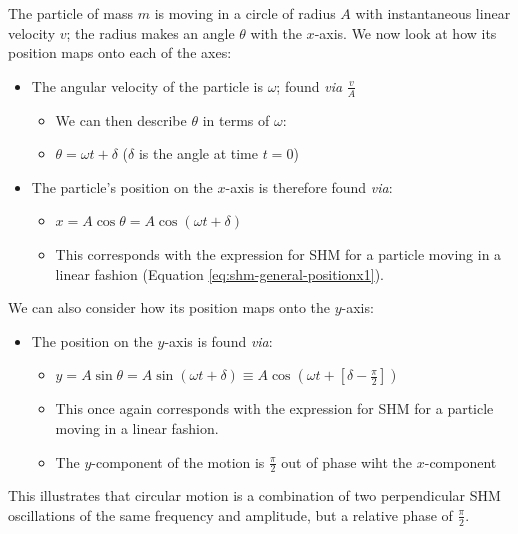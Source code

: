 \documentclass[
]{book}
\providecommand{\tightlist}{%
  \setlength{\itemsep}{0pt}\setlength{\parskip}{0pt}}
\begin{document}
The particle of mass \(m\) is moving in a circle of radius \(A\) with instantaneous linear velocity \(v\); the radius makes an angle \(\theta\) with the \(x\)-axis. We now look at how its position maps onto each of the axes:

\begin{itemize}
\tightlist
\item
  The angular velocity of the particle is \(\omega\); found \emph{via} \(\frac{v}{A}\)

  \begin{itemize}
  \tightlist
  \item
    We can then describe \(\theta\) in terms of \(\omega\):
  \item
    \(\theta = \omega t + \delta\) (\(\delta\) is the angle at time \(t=0\))
  \end{itemize}
\item
  The particle's position on the \(x\)-axis is therefore found \emph{via}:

  \begin{itemize}
  \tightlist
  \item
    \(x = A \cos \theta = A \cos (\omega t + \delta)\)
  \item
    This corresponds with the expression for SHM for a particle moving in a linear fashion (Equation \eqref{eq:shm-general-positionx1}).
  \end{itemize}
\end{itemize}

We can also consider how its position maps onto the \(y\)-axis:

\begin{itemize}
\tightlist
\item
  The position on the \(y\)-axis is found \emph{via}:

  \begin{itemize}
  \tightlist
  \item
    \(y = A \sin \theta = A \sin (\omega t + \delta) \equiv A \cos(\omega t + [\delta - \frac{\pi}{2}])\)
  \item
    This once again corresponds with the expression for SHM for a particle moving in a linear fashion.
  \item
    The \(y\)-component of the motion is \(\frac{\pi}{2}\) out of phase wiht the \(x\)-component
  \end{itemize}
\end{itemize}

This illustrates that circular motion is a combination of two perpendicular SHM oscillations of the same frequency and amplitude, but a relative phase of \(\frac{\pi}{2}\).
\end{document}
